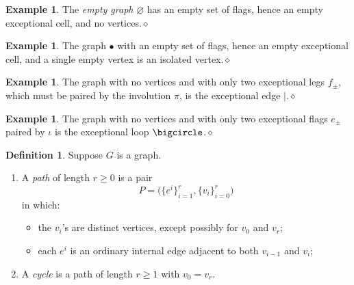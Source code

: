 \documentclass[11pt]{amsbook}
\numberwithin{section}{chapter}
\numberwithin{subsection}{section}
\numberwithin{equation}{section}
\theoremstyle{plain}
\theoremstyle{definition}
\newtheorem{definition}[equation]{Definition}
\newtheorem{example}[equation]{Example}
\newcommand{\edge}{\vert}
\newcommand{\dqed}{\hfill$\diamond$}
\begin{document}
\begin{example}\label{ex:basic-empty} The \emph{empty graph} $\varnothing$ \label{notation:empty-graph} has an empty set of flags, hence an empty exceptional cell, and no vertices.\dqed\end{example}

\begin{example}\label{ex:basic-isolated-vertex} The graph $\bullet$ with an empty set of flags, hence an empty exceptional cell, and a single empty vertex is an isolated vertex.\dqed\end{example}

\begin{example}\label{ex:basic-exceptional-edge} The graph with no vertices and with only two exceptional legs $f_{\pm}$, which must be paired by the involution $\pi$, is the exceptional edge $\edge$.\dqed\end{example}

\begin{example}\label{ex:basic-exceptional-loop} The graph with no vertices and with only two exceptional flags $e_{\pm}$ paired by $\iota$ is the exceptional loop $\bigcircle$.\dqed\end{example}

\begin{definition}\label{def:path} Suppose $G$ is a graph.
\begin{enumerate}\item A \emph{path} of length $r \geq 0$ is a pair \[P = \bigl(\{e^i\}_{i=1}^r, \{v_i\}_{i=0}^r\bigr)\] in which:
\begin{itemize} \item the $v_i$'s are distinct vertices, except possibly for $v_0$ and $v_r$;
\item each $e^i$ is an ordinary internal edge adjacent to both $v_{i-1}$ and $v_i$;
\end{itemize}
\item A \emph{cycle} is a path of length $r \geq 1$ with $v_0=v_r$.
\end{enumerate}\end{definition}
\end{document}
